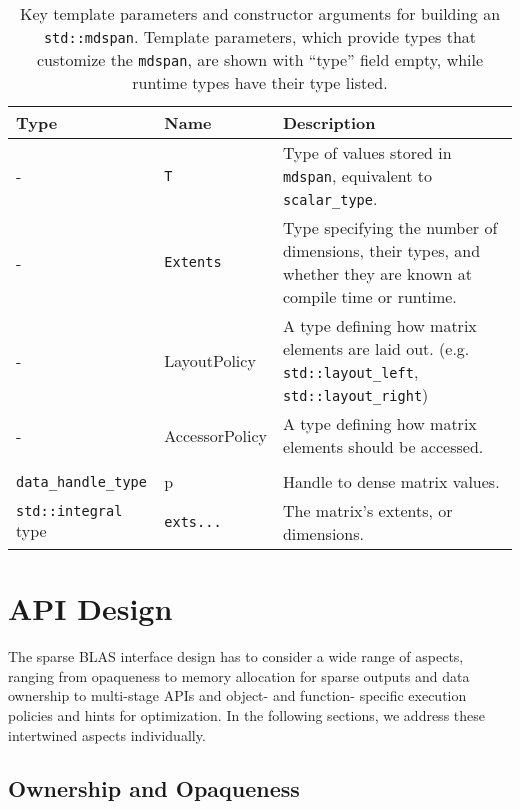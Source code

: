 \documentclass{article}
\begin{document}
\begin{table}[htbp]
\scriptsize
     \begin{tabular}{l l L{7cm}}
         \toprule
         \textbf{Type}    & \textbf{Name} & \textbf{Description} \\
         \midrule
         \texttt{}
         - & \texttt{T} & Type of values stored in \texttt{mdspan}, equivalent to \texttt{scalar\_type}. \\
         - & \texttt{Extents} & Type specifying the number of dimensions, their types, and whether they are known at compile time or runtime.\\
         - & LayoutPolicy & A type defining how matrix elements are laid out. (e.g. \texttt{std::layout\_left}, \texttt{std::layout\_right})\\
         - & AccessorPolicy & A type defining how matrix elements should be accessed.\\
         \\
         \texttt{data\_handle\_type} & p & Handle to dense matrix values. \\
         \texttt{std::integral} type & \texttt{exts...} & The matrix's extents, or dimensions.\\
         \bottomrule
     \end{tabular}
     \caption{Key template parameters and constructor arguments for building an \texttt{std::mdspan}.  Template parameters, which provide types that customize the \texttt{mdspan}, are shown with ``type'' field empty, while runtime types have their type listed.}
    \label{tab:dense_param}
\end{table}

%

\section{API Design}
\label{sec:api-design}

The sparse BLAS interface design has to consider a wide range of aspects, ranging from opaqueness to memory allocation for sparse outputs and data ownership to multi-stage APIs and object- and function- specific execution policies and hints for optimization. 
In the following sections, we address these intertwined aspects individually. 

\subsection{Ownership and Opaqueness}
\end{document}
